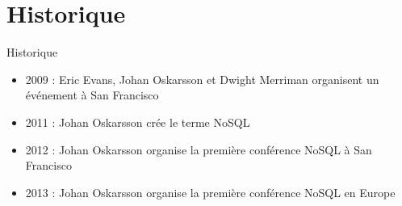\section{Historique}

\begin{frame}{Historique}

    \begin{itemize}
        \item 2009 : Eric Evans, Johan Oskarsson et Dwight Merriman organisent un événement à San Francisco
        \item 2011 : Johan Oskarsson crée le terme NoSQL
        \item 2012 : Johan Oskarsson organise la première conférence NoSQL à San Francisco
        \item 2013 : Johan Oskarsson organise la première conférence NoSQL en Europe
    \end{itemize}

\end{frame}

